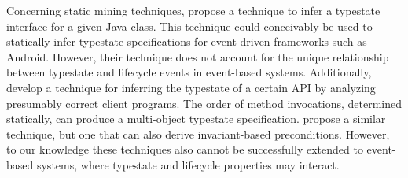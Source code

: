 \documentclass[10pt,reprint,nocopyrightspace,numbers]{sigplanconf}
\begin{document}



Concerning static mining techniques,
\citet{alur-synthesis} propose a technique to infer a typestate interface for a given Java class. This technique could conceivably be used to statically infer typestate specifications for event-driven frameworks such as Android. However, their technique does not account for the unique relationship between typestate and lifecycle events in event-based systems.
Additionally, \citet{shoham-yehav} develop a technique for inferring the typestate of a certain API by analyzing presumably correct client programs. The order of method invocations, determined statically, can produce a multi-object typestate specification. \citet{ramanathan-static-specs} propose a similar technique, but one that can also derive invariant-based preconditions. However, to our knowledge these techniques also cannot be successfully extended to event-based systems, where typestate and lifecycle properties may interact.

\end{document}

